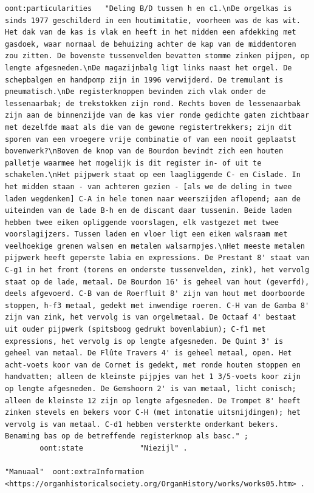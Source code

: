 \begin{lstlisting}[caption={Part14\_000Niezijl}]
        oont:particularities   "Deling B/D tussen h en c1.\nDe orgelkas is sinds 1977 geschilderd in een houtimitatie, voorheen was de kas wit. Het dak van de kas is vlak en heeft in het midden een afdekking met gasdoek, waar normaal de behuizing achter de kap van de middentoren zou zitten. De bovenste tussenvelden bevatten stomme zinken pijpen, op lengte afgesneden.\nDe magazijnbalg ligt links naast het orgel. De schepbalgen en handpomp zijn in 1996 verwijderd. De tremulant is pneumatisch.\nDe registerknoppen bevinden zich vlak onder de lessenaarbak; de trekstokken zijn rond. Rechts boven de lessenaarbak zijn aan de binnenzijde van de kas vier ronde gedichte gaten zichtbaar met dezelfde maat als die van de gewone registertrekkers; zijn dit sporen van een vroegere vrije combinatie of van een nooit geplaatst bovenwerk?\nBoven de knop van de Bourdon bevindt zich een houten palletje waarmee het mogelijk is dit register in- of uit te schakelen.\nHet pijpwerk staat op een laagliggende C- en Cislade. In het midden staan - van achteren gezien - [als we de deling in twee laden wegdenken] C-A in hele tonen naar weerszijden aflopend; aan de uiteinden van de lade B-h en de discant daar tussenin. Beide laden hebben twee eiken opliggende voorslagen, elk vastgezet met twee voorslagijzers. Tussen laden en vloer ligt een eiken walsraam met veelhoekige grenen walsen en metalen walsarmpjes.\nHet meeste metalen pijpwerk heeft geperste labia en expressions. De Prestant 8' staat van C-g1 in het front (torens en onderste tussenvelden, zink), het vervolg staat op de lade, metaal. De Bourdon 16' is geheel van hout (geverfd), deels afgevoerd. C-B van de Roerfluit 8' zijn van hout met doorboorde stoppen, h-f3 metaal, gedekt met inwendige roeren. C-H van de Gamba 8' zijn van zink, het vervolg is van orgelmetaal. De Octaaf 4' bestaat uit ouder pijpwerk (spitsboog gedrukt bovenlabium); C-f1 met expressions, het vervolg is op lengte afgesneden. De Quint 3' is geheel van metaal. De Flûte Travers 4' is geheel metaal, open. Het acht-voets koor van de Cornet is gedekt, met ronde houten stoppen en handvatten; alleen de kleinste pijpjes van het 1 3/5-voets koor zijn op lengte afgesneden. De Gemshoorn 2' is van metaal, licht conisch; alleen de kleinste 12 zijn op lengte afgesneden. De Trompet 8' heeft zinken stevels en bekers voor C-H (met intonatie uitsnijdingen); het vervolg is van metaal. C-d1 hebben versterkte onderkant bekers. Benaming bas op de betreffende registerknop als basc." ;
        oont:state             "Niezijl" .

"Manuaal"  oont:extraInformation  <https://organhistoricalsociety.org/OrganHistory/works/works05.htm> .


\end{lstlisting}
